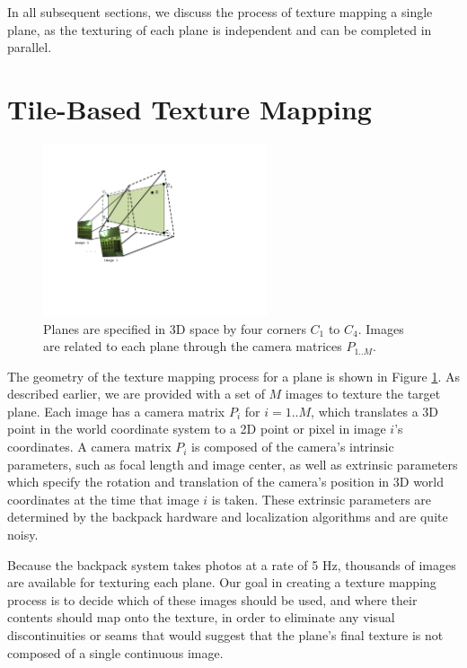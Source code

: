 \documentclass[10pt,twocolumn,letterpaper]{article}
\begin{document}
In all subsequent sections, we discuss the process of texture mapping
a single plane, as the texturing of each plane is independent and can
be completed in parallel.

\section{Tile-Based Texture Mapping}
\label{sec:simpleTextureMapping}
\begin{figure}
  \centering
  \includegraphics[height=2in]{Projection.pdf}
  \caption{Planes are specified in 3D space by four corners $C_1$ to
    $C_4$. Images are related to each plane through the camera
    matrices $P_{1..M}$. }
  \label{fig:projection}
\end{figure}

The geometry of the texture mapping process for a plane is shown in
Figure \ref{fig:projection}.  As described earlier, we are provided
with a set of $M$ images to texture the target plane. Each image has a
camera matrix $P_i$ for $i=1..M$, which translates a 3D point in the
world coordinate system to a 2D point or pixel in image $i$'s
coordinates. A camera matrix $P_i$ is composed of the camera's
intrinsic parameters, such as focal length and image center, as well
as extrinsic parameters which specify the rotation and translation of
the camera's position in 3D world coordinates at the time that image
$i$ is taken. These extrinsic parameters are determined by the
backpack hardware and localization algorithms \cite{chen2010indoor,
  liu2010indoor, kua2012loopclosure} and are quite noisy.

Because the backpack system takes photos at a rate of 5 Hz, thousands
of images are available for texturing each plane. Our goal in creating
a texture mapping process is to decide which of these images should be
used, and where their contents should map onto the texture, in order
to eliminate any visual discontinuities or seams that would suggest
that the plane's final texture is not composed of a single continuous
image.
\end{document}
